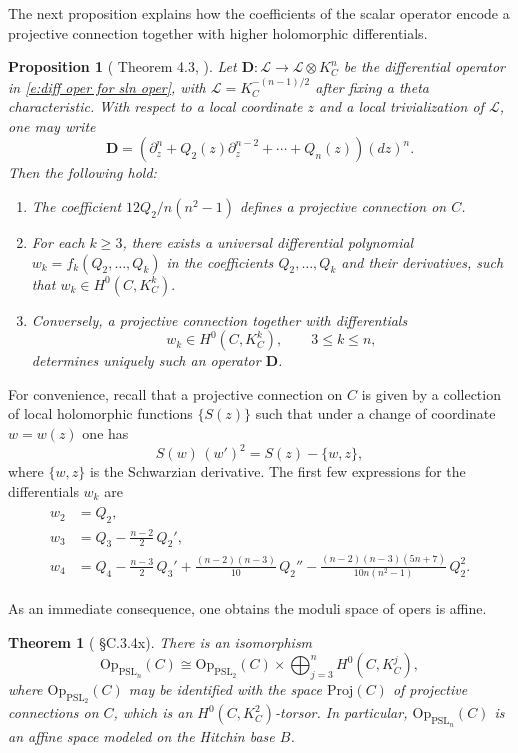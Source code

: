 \documentclass[twoside, 11pt]{article}
\numberwithin{equation}{section}
\theoremstyle{theorem}
\newtheorem{theorem}{Theorem}
\numberwithin{theorem}{section}
\newtheorem{proposition}[proposition]{Proposition}
\theoremstyle{definition}
\begin{document}
The next proposition explains how the coefficients of the scalar operator encode a projective connection together with higher holomorphic differentials.
\begin{proposition}[\cite{We15} Theorem 4.3, \cite{DIZ91}]\label{prop: k differential}
Let \( \mathbf{D}: \mathcal{L} \to \mathcal{L} \otimes K_C^{n} \) be the differential operator in \eqref{e:diff oper for sln oper}, with \( \mathcal{L} = K_C^{-(n-1)/2} \) after fixing a theta characteristic. With respect to a local coordinate $z$ and a local trivialization of $\mathcal{L}$, one may write
\begin{equation}\label{e:local form for D}
\mathbf{D}
=
\left(
\partial_z^n + Q_2(z)\partial_z^{n-2}+\cdots+Q_n(z)
\right)(dz)^n.
\end{equation}
Then the following hold:
\begin{enumerate}
    \item The coefficient \(12 Q_2/n(n^2-1)\)
    defines a projective connection on $C$.

    \item For each $k\ge 3$, there exists a universal differential polynomial
    \(
    w_k=f_k(Q_2,\dots,Q_k)
    \)
    in the coefficients $Q_2,\dots,Q_k$ and their derivatives, such that
    \(
    w_k\in H^0(C,K_C^k).
    \)

    \item Conversely, a projective connection together with differentials
    \[
    w_k\in H^0(C,K_C^k),\qquad 3\le k\le n,
    \]
    determines uniquely such an operator $\mathbf{D}$.
\end{enumerate}
\end{proposition}

For convenience, recall that a projective connection on $C$ is given by a collection of local holomorphic functions $\{S(z)\}$ such that under a change of coordinate $w=w(z)$ one has
\[
S(w)\,(w')^2=S(z)-\{w,z\},
\]
where $\{w,z\}$
is the Schwarzian derivative. The first few expressions for the differentials $w_k$ are
\begin{align}\label{e:W alg relations}
\begin{split}
w_2 &= Q_2,\\
w_3 &= Q_3-\frac{n-2}{2}\,Q_2',\\
w_4 &= Q_4-\frac{n-3}{2}\,Q_3'
+\frac{(n-2)(n-3)}{10}\,Q_2''
-\frac{(n-2)(n-3)(5n+7)}{10n(n^2-1)}\,Q_2^2.
\end{split}
\end{align}


As an immediate consequence, one obtains the moduli space of opers is affine.
\begin{theorem}[\cite{BD05} §C.3.4x] 
There is an isomorphism
\[
\mathrm{Op}_{\mathrm{PSL}_n}(C) \cong  \mathrm{Op}_{\mathrm{PSL}_2}(C) \times \bigoplus_{j=3}^n H^0(C, K_C^j),
\]
where $\mathrm{Op}_{\mathrm{PSL}_2}(C)$ may be identified with the space $\mathrm{Proj}(C)$ of projective connections on $C$, which is an $H^0(C,K_C^2)$-torsor. 
In particular, $\mathrm{Op}_{\mathrm{PSL}_n}(C)$ is an affine space modeled on the Hitchin base $B$.
\end{theorem}
\end{document}

